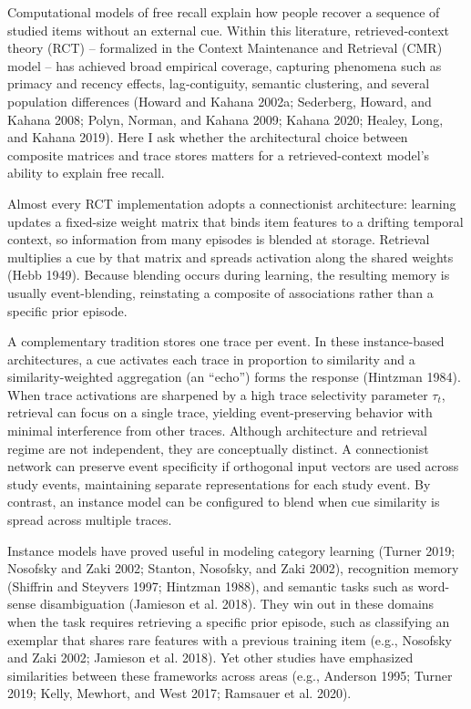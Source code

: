 \documentclass[
  letterpaper,
  11pt,
  english,
  singlespacing,
  headsepline]{MastersDoctoralThesis}
\begin{document}
Computational models of free recall explain how people recover a
sequence of studied items without an external cue. Within this
literature, retrieved‑context theory (RCT) -- formalized in the Context
Maintenance and Retrieval (CMR) model -- has achieved broad empirical
coverage, capturing phenomena such as primacy and recency effects,
lag‑contiguity, semantic clustering, and several population differences
(Howard and Kahana 2002a; Sederberg, Howard, and Kahana 2008; Polyn,
Norman, and Kahana 2009; Kahana 2020; Healey, Long, and Kahana 2019).
Here I ask whether the architectural choice between composite matrices
and trace stores matters for a retrieved-context model's ability to
explain free recall.

Almost every RCT implementation adopts a connectionist architecture:
learning updates a fixed-size weight matrix that binds item features to
a drifting temporal context, so information from many episodes is
blended at storage. Retrieval multiplies a cue by that matrix and
spreads activation along the shared weights (Hebb 1949). Because
blending occurs during learning, the resulting memory is usually
event-blending, reinstating a composite of associations rather than a
specific prior episode.

A complementary tradition stores one trace per event. In these
instance-based architectures, a cue activates each trace in proportion
to similarity and a similarity-weighted aggregation (an ``echo'') forms
the response (Hintzman 1984). When trace activations are sharpened by a
high trace selectivity parameter \(\tau_t\), retrieval can focus on a
single trace, yielding event-preserving behavior with minimal
interference from other traces. Although architecture and retrieval
regime are not independent, they are conceptually distinct. A
connectionist network can preserve event specificity if orthogonal input
vectors are used across study events, maintaining separate
representations for each study event. By contrast, an instance model can
be configured to blend when cue similarity is spread across multiple
traces.

Instance models have proved useful in modeling category learning (Turner
2019; Nosofsky and Zaki 2002; Stanton, Nosofsky, and Zaki 2002),
recognition memory (Shiffrin and Steyvers 1997; Hintzman 1988), and
semantic tasks such as word-sense disambiguation (Jamieson et al. 2018).
They win out in these domains when the task requires retrieving a
specific prior episode, such as classifying an exemplar that shares rare
features with a previous training item (e.g., Nosofsky and Zaki 2002;
Jamieson et al. 2018). Yet other studies have emphasized similarities
between these frameworks across areas (e.g., Anderson 1995; Turner 2019;
Kelly, Mewhort, and West 2017; Ramsauer et al. 2020).
\end{document}
